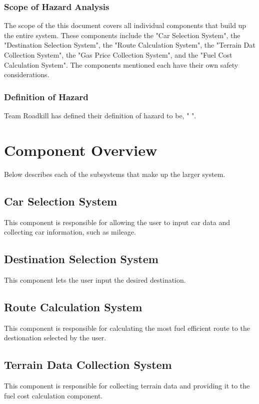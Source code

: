 \documentclass{article}
\begin{document}
\subsubsection{Scope of Hazard Analysis}
The scope of the this document covers all individual components that build up the entire system. These components include the "Car Selection System", the "Destination Selection System", the "Route Calculation System", the "Terrain Dat Collection System", the "Gas Price Collection System", and the "Fuel Cost Calculation System". The components mentioned each have their own safety considerations.

\subsubsection{Definition of Hazard}
Team Roadkill has defined their definition of hazard to be, " ".


\section{Component Overview}
Below describes each of the subsystems that make up the larger system.

\subsection{Car Selection System}
This component is responsible for allowing the user to input car data and collecting car information, such as mileage.

\subsection{Destination Selection System}
This component lets the user input the desired destination.

\subsection{Route Calculation System}
This component is responsible for calculating the most fuel efficient route to the destionation selected by the user.

\subsection{Terrain Data Collection System}
This component is responsible for collecting terrain data and providing it to the fuel cost calculation component.
\end{document}
